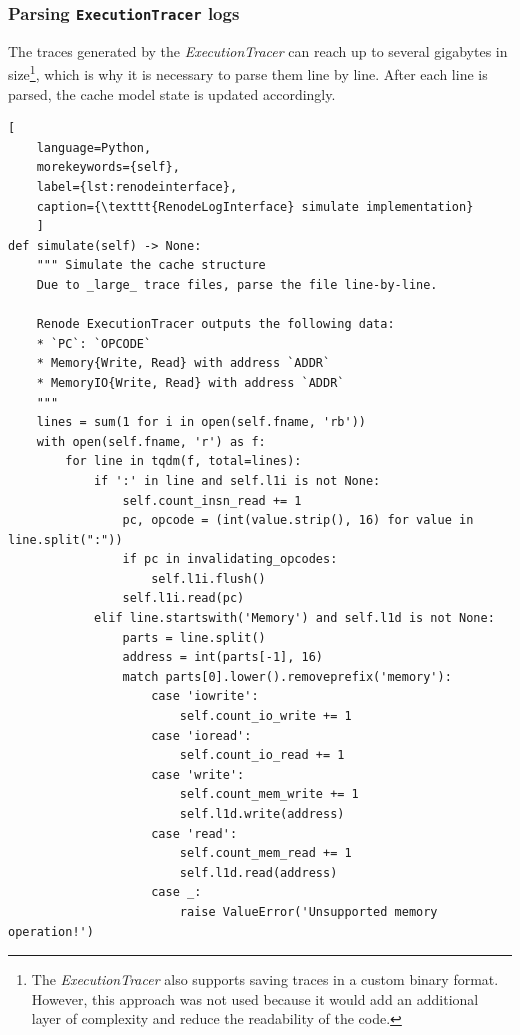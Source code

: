 \subsubsection*{Parsing \texttt{ExecutionTracer} logs}

The traces generated by the \textit{ExecutionTracer} can reach up to several gigabytes in size\footnote{The \textit{ExecutionTracer} also supports saving traces in a custom binary format. However,
this approach was not used because it would add an additional layer of complexity and reduce the readability of the code.}, which is why it is necessary to parse them line by line. 
After each line is parsed, the cache model state is updated accordingly.

\begin{center}
\centering
\begin{minipage}{\linewidth}
\begin{lstlisting}[
    language=Python,
	morekeywords={self},
    label={lst:renodeinterface},
    caption={\texttt{RenodeLogInterface} simulate implementation}
    ]
def simulate(self) -> None:
    """ Simulate the cache structure
    Due to _large_ trace files, parse the file line-by-line.

    Renode ExecutionTracer outputs the following data:
    * `PC`: `OPCODE`
    * Memory{Write, Read} with address `ADDR`
    * MemoryIO{Write, Read} with address `ADDR`
    """
    lines = sum(1 for i in open(self.fname, 'rb'))
    with open(self.fname, 'r') as f:
        for line in tqdm(f, total=lines):
            if ':' in line and self.l1i is not None:
                self.count_insn_read += 1
                pc, opcode = (int(value.strip(), 16) for value in line.split(":"))
                if pc in invalidating_opcodes:
                    self.l1i.flush()
                self.l1i.read(pc)
            elif line.startswith('Memory') and self.l1d is not None:
                parts = line.split()
                address = int(parts[-1], 16)
                match parts[0].lower().removeprefix('memory'):
                    case 'iowrite':
                        self.count_io_write += 1
                    case 'ioread':
                        self.count_io_read += 1
                    case 'write':
                        self.count_mem_write += 1
                        self.l1d.write(address)
                    case 'read':
                        self.count_mem_read += 1
                        self.l1d.read(address)
                    case _:
                        raise ValueError('Unsupported memory operation!')
\end{lstlisting}
\end{minipage}
\end{center}

